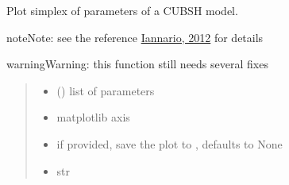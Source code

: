 \documentclass[letterpaper,10pt,english]{sphinxmanual}
\begin{document}
\begin{fulllineitems}
\label{\detokenize{cubmods:cubmods.cubsh.plot_simplex}}
\pysigstartsignatures
{}
\pysigstopsignatures
\sphinxAtStartPar
Plot simplex of parameters of a CUBSH model.

\begin{sphinxadmonition}{note}{Note:}
\sphinxAtStartPar
see the reference \hyperlink{cite.references:id9}{Iannario, 2012} for details
\end{sphinxadmonition}

\begin{sphinxadmonition}{warning}{Warning:}
\sphinxAtStartPar
this function still needs several fixes
\end{sphinxadmonition}
\begin{quote}\begin{description}
\begin{itemize}
\item {} 
\sphinxAtStartPar
{} () \textendash{} list of \sphinxcode{\sphinxupquote{{[}pi1, pi2{]}}} parameters

\item {} 
\sphinxAtStartPar
{} \textendash{} matplotlib axis

\item {} 
\sphinxAtStartPar
{} \textendash{} if provided, save the plot to , defaults to None

\item {} 
\sphinxAtStartPar
{} \textendash{} str

\end{itemize}

\end{description}\end{quote}

\end{fulllineitems}

\end{document}
